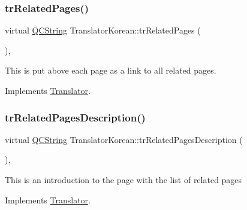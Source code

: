 \mbox{\label{class_translator_korean_aff14382691c92f2af204f12aca3d6dac}} 
\subsubsection{\texorpdfstring{trRelatedPages()}{trRelatedPages()}}
{\footnotesize\ttfamily virtual \mbox{\hyperlink{class_q_c_string}{Q\+C\+String}} Translator\+Korean\+::tr\+Related\+Pages (\begin{DoxyParamCaption}{ }\end{DoxyParamCaption})\hspace{0.3cm}{\ttfamily [inline]}, {\ttfamily [virtual]}}

This is put above each page as a link to all related pages. 

Implements \mbox{\hyperlink{class_translator}{Translator}}.

\mbox{\label{class_translator_korean_a02c07cb9769e38431f3ee34b9cb46d19}} 
\subsubsection{\texorpdfstring{trRelatedPagesDescription()}{trRelatedPagesDescription()}}
{\footnotesize\ttfamily virtual \mbox{\hyperlink{class_q_c_string}{Q\+C\+String}} Translator\+Korean\+::tr\+Related\+Pages\+Description (\begin{DoxyParamCaption}{ }\end{DoxyParamCaption})\hspace{0.3cm}{\ttfamily [inline]}, {\ttfamily [virtual]}}

This is an introduction to the page with the list of related pages 

Implements \mbox{\hyperlink{class_translator}{Translator}}.

\mbox{\label{class_translator_korean_aa90bf0e4a7bb5c89cde511affbb65126}} 
